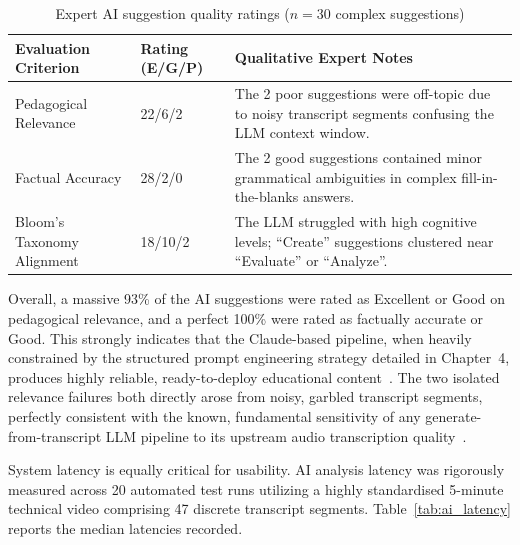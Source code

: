 \begin{table}[H]
  \centering
  \begin{tabularx}{\linewidth}{>{\raggedright\arraybackslash}p{3.2cm} l >{\raggedright\arraybackslash}X}
    \toprule
    \textbf{Evaluation Criterion} & \textbf{Rating (E/G/P)} & \textbf{Qualitative Expert Notes} \\
    \midrule
    Pedagogical Relevance & 22/6/2 & The 2 poor suggestions were off-topic due to noisy transcript segments confusing the LLM context window. \\
    \addlinespace
    Factual Accuracy & 28/2/0 & The 2 good suggestions contained minor grammatical ambiguities in complex fill-in-the-blanks answers. \\
    \addlinespace
    Bloom's Taxonomy Alignment & 18/10/2 & The LLM struggled with high cognitive levels; ``Create'' suggestions clustered near ``Evaluate'' or ``Analyze''. \\
    \bottomrule
  \end{tabularx}
  \small %
  \caption{Expert AI suggestion quality ratings ($n=30$ complex suggestions)}
  \label{tab:ai_quality}
\end{table}

Overall, a massive 93\% of the AI suggestions were rated as Excellent or Good on pedagogical relevance, and a perfect 100\% were rated as factually accurate or Good. This strongly indicates that the Claude-based pipeline, when heavily constrained by the structured prompt engineering strategy detailed in Chapter~4, produces highly reliable, ready-to-deploy educational content~\cite{anthropic2024,wei2022}. The two isolated relevance failures both directly arose from noisy, garbled transcript segments, perfectly consistent with the known, fundamental sensitivity of any generate-from-transcript LLM pipeline to its upstream audio transcription quality~\cite{radford2023}.

System latency is equally critical for usability. AI analysis latency was rigorously measured across 20 automated test runs utilizing a highly standardised 5-minute technical video comprising 47 discrete transcript segments. Table~\ref{tab:ai_latency} reports the median latencies recorded.

